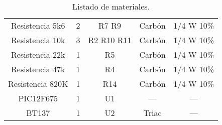 \begin{table}[H]
\begin{tabular}{| c | c | c |  c |  c |}
        Resistencia 5k6 & 2 & R7 R9 & Carbón  & 1/4 W 10\%   \\ 
        Resistencia 10k & 3 & R2 R10 R11 & Carbón   & 1/4 W 10\%   \\ 
        Resistencia 22k & 1 & R5 & Carbón  & 1/4 W  10\%  \\ 
        Resistencia 47k & 1 & R4 & Carbón  & 1/4 W  10\% \\ 
       	Resistencia 820K & 1 & R14 &  Carbón & 1/4 W  10\% \\ 
        PIC12F675 & 1 & U1 & ---  & --- \\ 
        BT137 & 1 & U2 & Triac  & ---  \\ 
      \hline
  \end{tabular}  
   \caption{Listado de materiales.}
   \label{tabla:listaMaterialesReceptor}
\end{table}

